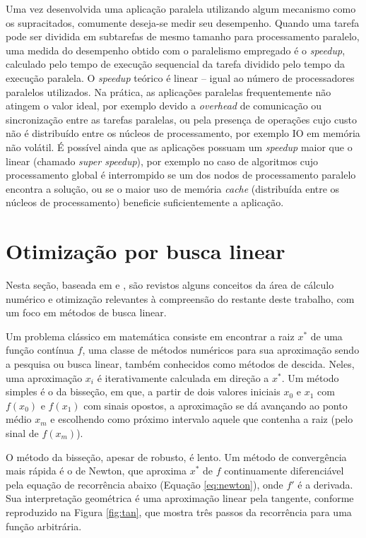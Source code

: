\documentclass[cic,tc]{iiufrgs}
\begin{document}
Uma vez desenvolvida uma aplicação paralela utilizando algum mecanismo como os
supracitados, comumente deseja-se medir seu desempenho. Quando uma tarefa pode
ser dividida em subtarefas de mesmo tamanho para processamento paralelo, uma
medida do desempenho obtido com o paralelismo empregado é o \textit{speedup},
calculado pelo tempo de execução sequencial da tarefa dividido pelo tempo da
execução paralela. O \textit{speedup} teórico é linear -- igual ao número de
processadores paralelos utilizados. Na prática, as aplicações paralelas
frequentemente não atingem o valor ideal, por exemplo devido a
\textit{overhead} de comunicação ou sincronização entre as tarefas paralelas,
ou pela presença de operações cujo custo não é distribuído entre os núcleos de
processamento, por exemplo IO em memória não volátil. É possível ainda que as
aplicações possuam um \textit{speedup} maior que o linear (chamado
\textit{super speedup}), por exemplo no caso de algoritmos cujo processamento
global é interrompido se um dos nodos de processamento paralelo encontra a
solução, ou se o maior uso de memória \textit{cache} (distribuída entre os
núcleos de processamento) beneficie suficientemente a aplicação.

\section{Otimização por busca linear}
\label{sec:bfgs}

Nesta seção, baseada em \cite{stewart1991calculus} e
\cite{nocedal2006numerical}, são revistos alguns conceitos da área de cálculo
numérico e otimização relevantes à compreensão do restante deste trabalho, com
um foco em métodos de busca linear.

Um problema clássico em matemática consiste em encontrar a raiz $x^*$ de uma
função contínua $f$, uma classe de métodos numéricos para sua aproximação sendo
a pesquisa ou busca linear, também conhecidos como métodos de descida. Neles,
uma aproximação $x_i$ é iterativamente calculada em direção a $x^*$. Um método
simples é o da bisseção, em que, a partir de dois valores iniciais $x_0$ e
$x_1$ com $f(x_0)$ e $f(x_1)$ com sinais opostos, a aproximação se dá avançando
ao ponto médio $x_m$ e escolhendo como próximo intervalo aquele que contenha a
raiz (pelo sinal de $f(x_m)$).

O método da bisseção, apesar de robusto, é lento. Um método de convergência
mais rápida é o de Newton, que aproxima $x^*$ de $f$ continuamente diferenciável
pela equação de recorrência abaixo (Equação \ref{eq:newton}), onde $f'$ é a
derivada. Sua interpretação geométrica é uma aproximação linear pela tangente,
conforme reproduzido na Figura \ref{fig:tan}, que mostra três passos da
recorrência para uma função arbitrária.
\end{document}

